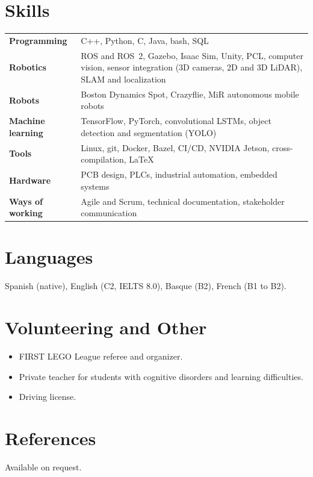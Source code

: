 \documentclass[a4paper,11pt]{article}
\newif\ifreferees  %
\newcommand{\cvreferences}{}
\begin{document}
\section{Skills}
\begin{tabularx}{\linewidth}{@{}l X@{}}
    \textbf{Programming} & C++, Python, C, Java, bash, SQL \\
    \textbf{Robotics} & ROS and ROS~2, Gazebo, Isaac Sim, Unity, PCL, computer vision, sensor integration (3D cameras, 2D and 3D LiDAR), SLAM and localization \\
    \textbf{Robots} & Boston Dynamics Spot, Crazyflie, MiR autonomous mobile robots \\
    \textbf{Machine learning} & TensorFlow, PyTorch, convolutional LSTMs, object detection and segmentation (YOLO) \\
    \textbf{Tools} & Linux, git, Docker, Bazel, CI/CD, NVIDIA Jetson, cross-compilation, LaTeX \\
    \textbf{Hardware} & PCB design, PLCs, industrial automation, embedded systems \\
    \textbf{Ways of working} & Agile and Scrum, technical documentation, stakeholder communication \\
\end{tabularx}


\section{Languages}
Spanish (native), English (C2, IELTS 8.0), Basque (B2), French (B1 to B2).

\section{Volunteering and Other}
\begin{itemize}
    \item FIRST LEGO League referee and organizer.
    \item Private teacher for students with cognitive disorders and learning difficulties.
    \item Driving license.
\end{itemize}

\section{References}
\ifreferees\cvreferences\else Available on request.\fi
\end{document}
